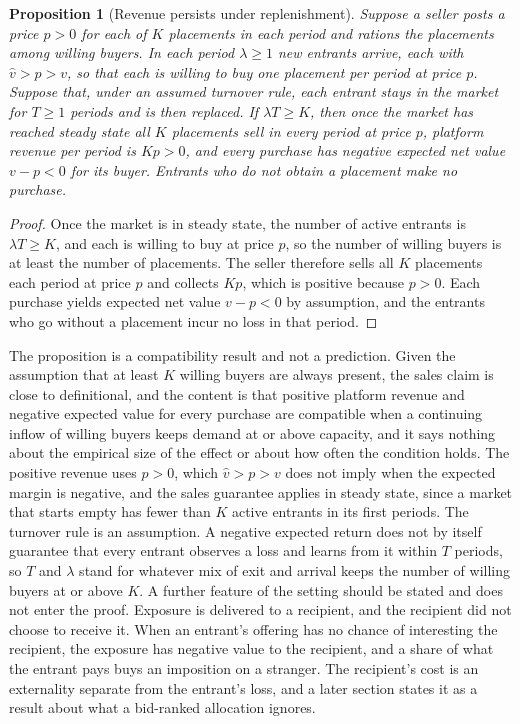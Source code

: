 \documentclass[11pt]{article}
\newtheorem{proposition}{Proposition}
\theoremstyle{definition}
\begin{document}
\begin{proposition}[Revenue persists under replenishment]\label{prop:replenish}
Suppose a seller posts a price $p>0$ for each of $K$ placements in each period and rations the placements among willing buyers. In each period $\lambda\ge 1$ new entrants arrive, each with $\hat v>p>v$, so that each is willing to buy one placement per period at price $p$. Suppose that, under an assumed turnover rule, each entrant stays in the market for $T\ge 1$ periods and is then replaced. If $\lambda T\ge K$, then once the market has reached steady state all $K$ placements sell in every period at price $p$, platform revenue per period is $Kp>0$, and every purchase has negative expected net value $v-p<0$ for its buyer. Entrants who do not obtain a placement make no purchase.
\end{proposition}

\begin{proof}
Once the market is in steady state, the number of active entrants is $\lambda T\ge K$, and each is willing to buy at price $p$, so the number of willing buyers is at least the number of placements. The seller therefore sells all $K$ placements each period at price $p$ and collects $Kp$, which is positive because $p>0$. Each purchase yields expected net value $v-p<0$ by assumption, and the entrants who go without a placement incur no loss in that period.
\end{proof}

The proposition is a compatibility result and not a prediction. Given the assumption that at least $K$ willing buyers are always present, the sales claim is close to definitional, and the content is that positive platform revenue and negative expected value for every purchase are compatible when a continuing inflow of willing buyers keeps demand at or above capacity, and it says nothing about the empirical size of the effect or about how often the condition holds. The positive revenue uses $p>0$, which $\hat v>p>v$ does not imply when the expected margin is negative, and the sales guarantee applies in steady state, since a market that starts empty has fewer than $K$ active entrants in its first periods. The turnover rule is an assumption. A negative expected return does not by itself guarantee that every entrant observes a loss and learns from it within $T$ periods, so $T$ and $\lambda$ stand for whatever mix of exit and arrival keeps the number of willing buyers at or above $K$. A further feature of the setting should be stated and does not enter the proof. Exposure is delivered to a recipient, and the recipient did not choose to receive it. When an entrant's offering has no chance of interesting the recipient, the exposure has negative value to the recipient, and a share of what the entrant pays buys an imposition on a stranger. The recipient's cost is an externality separate from the entrant's loss, and a later section states it as a result about what a bid-ranked allocation ignores.
\end{document}
